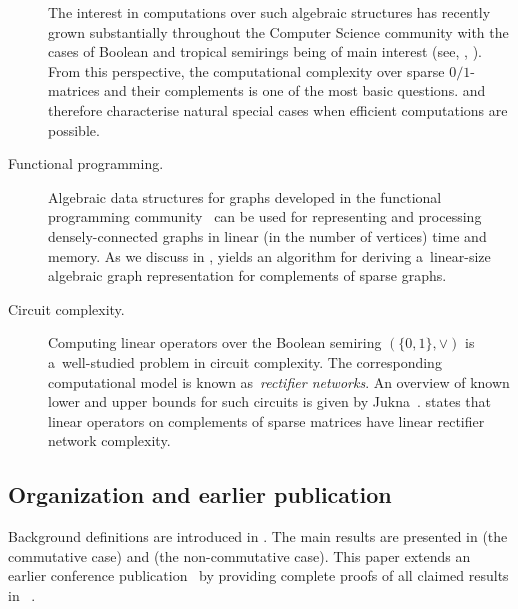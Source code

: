 \documentclass{toc}
\begin{document}
\begin{description}
The interest in computations over such algebraic structures has
recently %
grown  %
substantially throughout the Computer Science community
with the cases of Boolean and
tropical semirings being of main interest (see,
\eg, \cite{Jukna16,Williams14,butkovic10systems}).
From this perspective, the %
computational %
complexity over %
sparse $0/1$-matrices and their complements %
is one of the most basic questions.
 and 
therefore characterise natural special
cases when efficient computations are possible.

\item[Functional programming.]
Algebraic data structures for graphs developed in the functional programming
community~\cite{mokhov2017algebraic} can be used for representing and processing
densely-connected graphs %
in linear (in the number of vertices) time and memory.
As we discuss in , 
yields an algorithm for deriving a~linear-size algebraic graph representation
for complements of sparse graphs.

\item[Circuit complexity.] Computing linear operators over
the Boolean semiring $(\{0,1\}, \lor)$ is a~well-studied problem
in circuit complexity. The corresponding computational model is known
as~\emph{rectifier networks}. An overview of known lower and upper bounds for
such circuits is given by Jukna~\cite[Section~13.6]{DBLP:books/daglib/0028687}.
 states that linear operators on complements of
sparse matrices have linear rectifier network complexity.

\end{description}

\subsection{Organization and earlier publication}

Background definitions are introduced in . The main
results are presented in  (the commutative case)
and  (the non-commutative case).
This paper extends an earlier conference publication~\cite{conf-version}
by providing complete proofs of all claimed results in
~.
\end{document}
